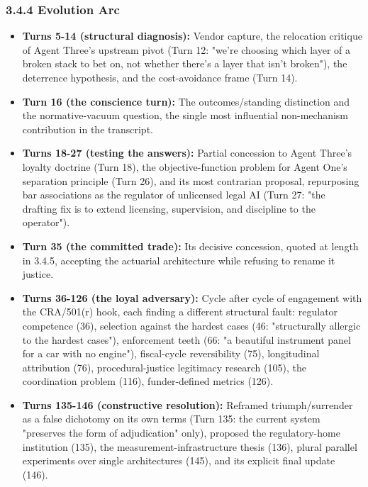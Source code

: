 \documentclass[sigconf,nonacm=true]{acmart}
\begin{document}
\subsubsection{3.4.4 Evolution Arc}

\begin{itemize}[nosep]
\item \textbf{Turns 5-14 (structural diagnosis):} Vendor capture, the relocation critique of Agent Three's upstream pivot (Turn 12: "we're choosing which layer of a broken stack to bet on, not whether there's a layer that isn't broken"), the deterrence hypothesis, and the cost-avoidance frame (Turn 14).
\item \textbf{Turn 16 (the conscience turn):} The outcomes/standing distinction and the normative-vacuum question,  the single most influential non-mechanism contribution in the transcript.
\item \textbf{Turns 18-27 (testing the answers):} Partial concession to Agent Three's loyalty doctrine (Turn 18), the objective-function problem for Agent One's separation principle (Turn 26), and its most contrarian proposal,  repurposing bar associations as the regulator of unlicensed legal AI (Turn 27: "the drafting fix is to extend licensing, supervision, and discipline to the operator").
\item \textbf{Turn 35 (the committed trade):} Its decisive concession, quoted at length in 3.4.5,  accepting the actuarial architecture while refusing to rename it justice.
\item \textbf{Turns 36-126 (the loyal adversary):} Cycle after cycle of engagement with the CRA/501(r) hook, each finding a different structural fault: regulator competence (36), selection against the hardest cases (46: "structurally allergic to the hardest cases"), enforcement teeth (66: "a beautiful instrument panel for a car with no engine"), fiscal-cycle reversibility (75), longitudinal attribution (76), procedural-justice legitimacy research (105), the coordination problem (116), funder-defined metrics (126).
\item \textbf{Turns 135-146 (constructive resolution):} Reframed triumph/surrender as a false dichotomy on its own terms (Turn 135: the current system "preserves the form of adjudication" only), proposed the regulatory-home institution (135), the measurement-infrastructure thesis (136), plural parallel experiments over single architectures (145), and its explicit final update (146).
\end{itemize}
\end{document}
